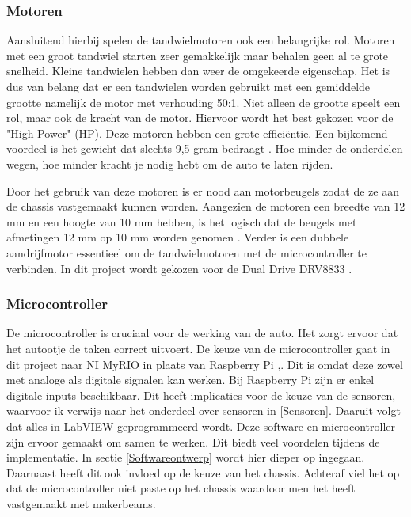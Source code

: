 \documentclass[a4paper,twoside,kulak]{kulakreport} %
\begin{document}
\subsubsection{Motoren}
Aansluitend hierbij spelen de tandwielmotoren ook een belangrijke rol. Motoren met een groot tandwiel starten zeer gemakkelijk maar behalen geen al te grote snelheid. Kleine tandwielen hebben dan weer de omgekeerde eigenschap. Het is dus van belang dat er een tandwielen worden gebruikt met een gemiddelde grootte namelijk de motor met verhouding 50:1. Niet alleen de grootte speelt een rol, maar ook de kracht van de motor. Hiervoor wordt het best gekozen voor de "High Power" (HP). Deze motoren hebben een grote efficiëntie. %
Een bijkomend voordeel is het gewicht dat slechts 9,5 gram bedraagt \cite{MicroMetalGearMotor50:1HP}. %
Hoe minder de onderdelen wegen, hoe minder kracht je nodig hebt om de auto te laten rijden. 

Door het gebruik van deze motoren is er nood aan motorbeugels zodat de ze aan de chassis  vastgemaakt kunnen worden. Aangezien de motoren een breedte van 12 mm en een hoogte van 10 mm hebben, is het logisch dat de beugels met afmetingen 12 mm op 10 mm worden genomen \cite{MicroMetalGearMotorBeugel}.
Verder is een dubbele aandrijfmotor essentieel om de tandwielmotoren met de microcontroller te verbinden. In dit project wordt gekozen voor de Dual Drive DRV8833 \cite{DualDriveDRV8833}. 
\label{Motoren}


\subsubsection{Microcontroller}
De microcontroller is cruciaal voor de werking van de auto. Het zorgt ervoor dat het autootje de taken correct uitvoert. De keuze van de microcontroller gaat in dit project naar NI MyRIO in plaats van Raspberry Pi \cite{nimyrio},\cite{RaspberryPi}.
Dit is omdat deze zowel met analoge als digitale signalen kan werken. 
Bij Raspberry Pi zijn er enkel digitale inputs beschikbaar. Dit heeft implicaties voor de keuze van de sensoren, waarvoor ik verwijs naar het onderdeel over sensoren in \ref{Sensoren}.
Daaruit volgt dat alles in LabVIEW geprogrammeerd wordt.
Deze software en microcontroller zijn ervoor gemaakt om samen te werken. Dit biedt veel voordelen tijdens de implementatie. In sectie \ref{Softwareontwerp} wordt hier dieper op ingegaan. %
Daarnaast heeft dit ook invloed op de keuze van het chassis. Achteraf viel het op dat de microcontroller niet paste op het chassis waardoor men het heeft vastgemaakt met makerbeams.
\end{document}

